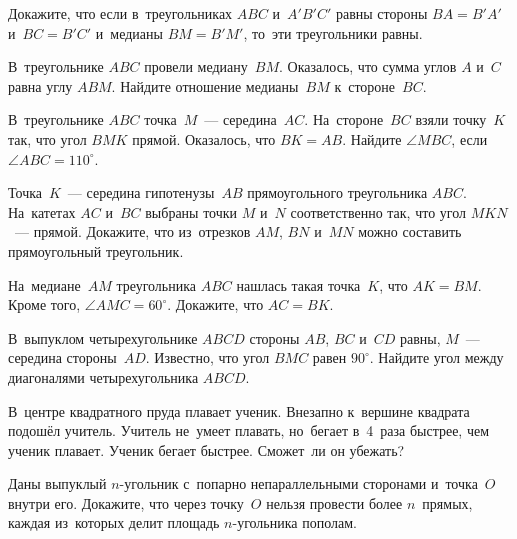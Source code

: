 


\begin{problems}

\item
Докажите, что если в~треугольниках $ABC$ и~$A'B'C'$ равны стороны $BA = B'A'$
и~$BC = B'C'$ и~медианы $BM = B'M'$, то~эти треугольники равны.

\item
В~треугольнике $ABC$ провели медиану~$BM$.
Оказалось, что сумма углов $A$ и~$C$ равна углу $ABM$.
Найдите отношение медианы~$BM$ к~стороне~$BC$.

\item
В~треугольнике $ABC$ точка~$M$~--- середина~$AC$.
На~стороне~$BC$ взяли точку~$K$ так, что угол $BMK$ прямой.
Оказалось, что $BK = AB$.
Найдите $\angle MBC$, если $\angle ABC = 110^{\circ}$.

\item
Точка~$K$~--- середина гипотенузы~$AB$ прямоугольного треугольника $ABC$.
На~катетах $AC$ и~$BC$ выбраны точки $M$ и~$N$ соответственно так, что
угол $MKN$~--- прямой.
Докажите, что из~отрезков $AM$, $BN$ и~$MN$ можно составить прямоугольный
треугольник.

\item
На~медиане~$AM$ треугольника $ABC$ нашлась такая точка~$K$, что  $AK = BM$.
Кроме того, $\angle AMC = 60^{\circ}$.
Докажите, что $AC = BK$.

\item
В~выпуклом четырехугольнике $ABCD$ стороны $AB$, $BC$ и~$CD$ равны,
$M$~--- середина стороны~$AD$.
Известно, что угол $BMC$ равен $90^\circ$.
Найдите угол между диагоналями четырехугольника $ABCD$.

\item
В~центре квадратного пруда плавает ученик.
Внезапно к~вершине квадрата подошёл учитель.
Учитель не~умеет плавать, но~бегает в~4~раза быстрее, чем ученик плавает.
Ученик бегает быстрее.
Сможет~ли он убежать?

\item
Даны выпуклый $n$-угольник с~попарно непараллельными сторонами и~точка~$O$
внутри его.
Докажите, что через точку~$O$ нельзя провести более $n$~прямых, каждая
из~которых делит площадь $n$-угольника пополам.

\end{problems}

